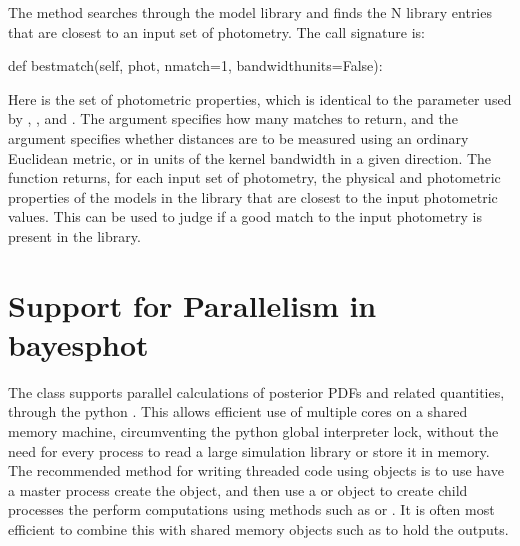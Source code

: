\documentclass[letterpaper,10pt,english]{sphinxmanual}
\begin{document}
The  method searches through the model library and finds the N library entries that are closest to an input set of photometry. The call signature is:

\begin{sphinxVerbatim}[commandchars=\\\{\}]
def bestmatch(self, phot, nmatch=1, bandwidth\PYGZus{}units=False):
\end{sphinxVerbatim}

Here  is the set of photometric properties, which is identical to the  parameter used by , , and . The argument  specifies how many matches to return, and the argument  specifies whether distances are to be measured using an ordinary Euclidean metric, or in units of the kernel bandwidth in a given direction. The function returns, for each input set of photometry, the physical and photometric properties of the  models in the library that are closest to the input photometric values. This can be used to judge if a good match to the input photometry is present in the library.


\section{Support for Parallelism in bayesphot}
\label{\detokenize{bayesphot:support-for-parallelism-in-bayesphot}}\label{\detokenize{bayesphot:ssec-bayesphot-threading}}
The  class supports parallel calculations of posterior PDFs and
related quantities, through the python . This
allows efficient use of multiple cores on a shared memory machine,
circumventing the python global interpreter lock, without the need for
every process to read a large simulation library or store it in
memory. The recommended method for writing threaded code using 
objects is to use have a master process create the  object, and
then use a 
or 
object to create child processes the perform computations using 
methods such as  or . It is often most efficient
to combine this with shared memory objects such as 
to hold the outputs.
\end{document}
